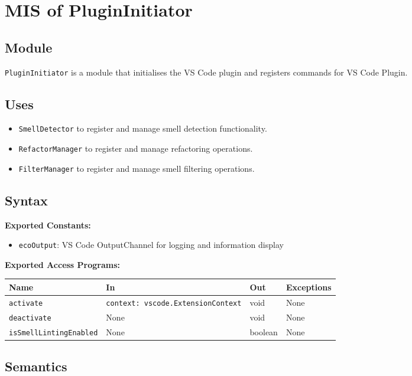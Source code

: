 \documentclass[12pt, titlepage]{article}
\begin{document}
\section{MIS of PluginInitiator}

\subsection{Module}
\texttt{PluginInitiator} is a module that initialises the VS Code plugin and registers commands for VS Code Plugin.

\subsection{Uses}
\begin{itemize}
    \item \texttt{SmellDetector} to register and manage smell detection functionality.
    \item \texttt{RefactorManager} to register and manage refactoring operations.
    \item \texttt{FilterManager} to register and manage smell filtering operations.
\end{itemize}

\subsection{Syntax}

\textbf{Exported Constants:} 
\begin{itemize}
    \item \texttt{ecoOutput}: VS Code OutputChannel for logging and information display
\end{itemize}

\noindent \textbf{Exported Access Programs:}\\
\begin{tabularx}{\linewidth}{|l|>{\raggedright\arraybackslash}X|l|l|}
    \hline
    \textbf{Name} & \textbf{In} & \textbf{Out} & \textbf{Exceptions} \\
    \hline
    \texttt{activate} & \texttt{context: vscode.ExtensionContext} & void & None \\
    \hline
    \texttt{deactivate} & None & void & None \\
    \hline
    \texttt{isSmellLintingEnabled} & None & boolean & None \\
    \hline
\end{tabularx}

\subsection{Semantics}
\end{document}
